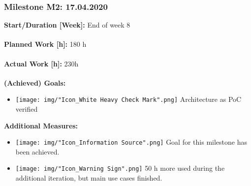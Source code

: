 			\subsubsection{Milestone M2: 17.04.2020}
				\textbf{Start/Duration [Week]:} End of week 8 \\~\\
				\textbf{Planned Work [h]:} 180 h \\~\\
				\textbf{Actual Work [h]:} 230h \\~\\
				\textbf{(Achieved) Goals:}
				\begin{itemize}
					\item \texttt{[image: img/"Icon\_White Heavy Check Mark".png]} Architecture as PoC verified
				\end{itemize}
				\textbf{Additional Measures:}
				\begin{itemize}
					\item \texttt{[image: img/"Icon\_Information Source".png]} Goal for this milestone has been achieved.
					\item \texttt{[image: img/"Icon\_Warning Sign".png]} 50 h more used during the additional iteration, but main use cases finished.
				\end{itemize}

